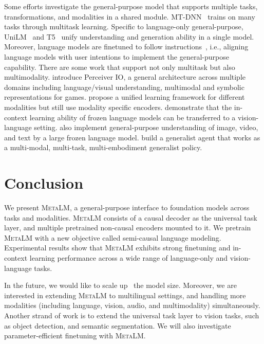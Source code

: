 \documentclass{article}
\theoremstyle{plain}
\theoremstyle{definition}
\theoremstyle{remark}
\newcommand\ours{\textsc{MetaLM}}
\begin{document}
Some efforts investigate the general-purpose model that supports multiple tasks, transformations, and modalities in a shared module.
MT-DNN~\citep{mtdnn} trains on many tasks through multitask learning.
Specific to language-only general-purpose, UniLM~\citep{unilm} and T5~\citep{t5} unify understanding and generation ability in a single model.
Moreover, language models are finetuned to follow instructions~\citep{instructgpt,flan,tzero}, i.e., aligning language models with user intentions to implement the general-purpose capability.
There are some work that support not only multitask but also multimodality.
\citet{perceiverio} introduce Perceiver IO, a general architecture across multiple domains including language/visual understanding, multimodal and symbolic representations for games.
\citet{data2vec} propose a unified learning framework for different modalities but still use modality specific encoders.
\citet{tsimpoukelli2021frozen} demonstrate that the in-context learning ability of frozen language models can be transferred to a vision-language setting.
\citet{flamingo} also implement general-purpose understanding of image, video, and text by a large frozen language model.
\citet{gato} build a generalist agent that works as a multi-modal, multi-task, multi-embodiment generalist policy.


\section{Conclusion}
\label{sec:conclusion}

We present \ours{}, a general-purpose interface to foundation models across tasks and modalities.
\ours{} consists of a causal decoder as the universal task layer, and multiple pretrained non-causal encoders mounted to it.
We pretrain \ours{} with a new objective called semi-causal language modeling.
Experimental results show that \ours{} exhibits strong finetuning and in-context learning performance across a wide range of language-only and vision-language tasks.

In the future, we would like to scale up~\citep{deepnet,xmoe} the model size.
Moreover, we are interested in extending \ours{} to multilingual settings, and handling more modalities (including language, vision, audio, and multimodality) simultaneously.
Another strand of work is to extend the universal task layer to vision tasks, such as object detection, and semantic segmentation.
We will also investigate parameter-efficient finetuning with \ours{}.
\end{document}
